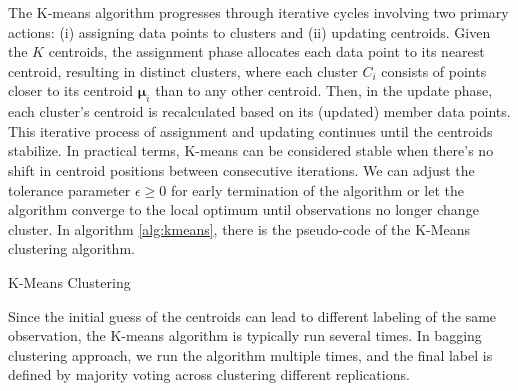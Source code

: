 The K-means algorithm progresses through iterative cycles involving two primary actions: (i) assigning data points to clusters and (ii) updating centroids. Given the $K$ centroids, the assignment phase allocates each data point to its nearest centroid, resulting in distinct clusters, where each cluster $C_i$ consists of points closer to its centroid $\bm{\mu}_i$ than to any other centroid. Then, in the update phase, each cluster's centroid is recalculated based on its (updated) member data points. This iterative process of assignment and updating continues until the centroids stabilize. In practical terms, K-means can be considered stable when there's no shift in centroid positions between consecutive iterations. We can adjust the tolerance parameter $\epsilon \geq 0$ for early termination of the algorithm or let the algorithm converge to the local optimum until observations no longer change cluster. In algorithm \ref{alg:kmeans}, there is the pseudo-code of the K-Means clustering algorithm.
\begin{algorithm}
\small
    \caption{K-Means Clustering}
    \label{alg:kmeans}
    \begin{algorithmic}[1]
    \REPEAT
    \ENDFOR
    \ENDFOR
    \end{algorithmic}
\end{algorithm} 
Since the initial guess of the centroids can lead to different labeling of the same observation, the K-means algorithm is typically run several times. In bagging clustering approach, we run the algorithm multiple times, and the final label is defined by majority voting across clustering different replications.


